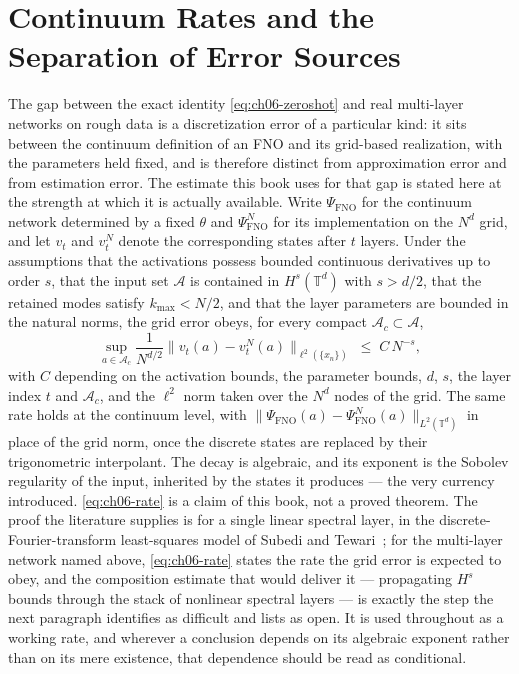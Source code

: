 \section{Continuum Rates and the Separation of Error Sources}
\label{sec:ch06-rates}

The gap between the exact identity \eqref{eq:ch06-zeroshot} and real multi-layer
networks on rough data is a discretization
error of a particular kind: it sits
between the continuum definition of an FNO and its grid-based realization, with
the parameters held fixed, and is therefore distinct from approximation error
and from estimation error. The estimate this book uses for that gap is stated
here at the strength at which it is actually available.
Write $\Psi_{\text{FNO}}$ for the
continuum network determined by a fixed $\theta$ and $\Psi_{\text{FNO}}^N$ for
its implementation on the $N^d$ grid, and let $v_t$ and $v_t^N$ denote the
corresponding states after $t$ layers. Under the assumptions that the
activations possess bounded continuous derivatives up to order $s$, that the
input set $\mathcal{A}$ is contained in $H^s(\mathbb{T}^d)$ with $s>d/2$, that
the retained modes satisfy $k_{\max}<N/2$, and that the layer parameters are
bounded in the natural norms, the grid error obeys, for every compact
$\mathcal{A}_c \subset \mathcal{A}$,
\begin{equation}
  \label{eq:ch06-rate}
  \sup_{a \in \mathcal{A}_c} \frac{1}{N^{d/2}} \big\| v_t(a) - v_t^N(a) \big\|_{\ell^2(\{x_n\})} \;\le\; C\, N^{-s},
\end{equation}
with $C$ depending on the activation bounds, the parameter bounds, $d$, $s$, the
layer index $t$ and $\mathcal{A}_c$, and the $\ell^2$ norm taken over the $N^d$
nodes of the grid. The same rate holds at the continuum level, with
$\|\Psi_{\text{FNO}}(a)-\Psi_{\text{FNO}}^N(a)\|_{L^2(\mathbb{T}^d)}$ in place of
the grid norm, once the discrete states are replaced by their trigonometric
interpolant. The decay is algebraic, and its
exponent is the Sobolev regularity of the input, inherited by the states it
produces --- the very currency
 introduced.
\eqref{eq:ch06-rate} is a claim of this book, not a proved theorem. The proof
the literature supplies is for a single linear spectral layer, in the
discrete-Fourier-transform least-squares model of Subedi and
Tewari~\cite{subedi2024controlling}; for the multi-layer network named above,
\eqref{eq:ch06-rate} states the rate the grid error is expected to obey, and the
composition estimate that would deliver it --- propagating $H^s$ bounds through
the stack of nonlinear spectral layers --- is exactly the step the next
paragraph identifies as difficult and 
lists as open. It is used throughout as a working rate, and wherever a
conclusion depends on its algebraic exponent rather than on its mere existence,
that dependence should be read as conditional.

